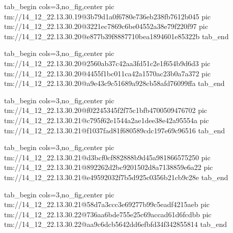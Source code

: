  
 
 
 
 

\qqSecCmtScr


\ifcmt
  tab_begin cols=3,no_fig,center
    pic tm://14_12_22.13.30.19@3b79d1a0f6780e736eb238fb7612b045
    pic tm://14_12_22.13.30.20@3221ec7869c6be04552a38e79f220f97
    pic tm://14_12_22.13.30.20@e877b39f8887710bea1894601e85322b
  tab_end
\fi


\ifcmt
  tab_begin cols=3,no_fig,center
    pic tm://14_12_22.13.30.20@2560ab37c42aa3fd51c2e1f654b9d6d3
    pic tm://14_12_22.13.30.20@4455f1bc011ca42a1570ac23b0a7a372
    pic tm://14_12_22.13.30.20@a9e43c9c51689a928cb58afd76099ffa
  tab_end
\fi


\ifcmt
  tab_begin cols=3,no_fig,center
    pic tm://14_12_22.13.30.20@f02245345f2f75c1bfb4700509476702
    pic tm://14_12_22.13.30.21@c795f62e1544a2ae1dee38e42a95554a
    pic tm://14_12_22.13.30.21@f1037fad81f680589cdc197e69c96516
  tab_end
\fi


\ifcmt
  tab_begin cols=3,no_fig,center
    pic tm://14_12_22.13.30.21@d3bcf0cf882888b9d45a981866575250
    pic tm://14_12_22.13.30.21@892262d2bc9201502d8a7138859e6a22
    pic tm://14_12_22.13.30.21@e49592032f7b5d925c0356b21cb9c28e
  tab_end
\fi


\ifcmt
  tab_begin cols=3,no_fig,center
    pic tm://14_12_22.13.30.21@58d7a3ccc3e69277b99c5eadf4215aeb
    pic tm://14_12_22.13.30.22@736aa6bde755e25c69accad61d6fcdbb
    pic tm://14_12_22.13.30.22@aa9c6dcb5642dd6efbfd34f342855814
  tab_end
\fi

